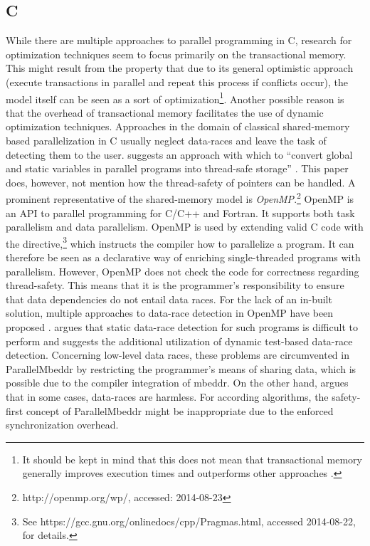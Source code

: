 \subsection{C}
While there are multiple approaches to parallel programming in C, research for optimization techniques seem to focus primarily on the transactional memory\cite{DynamicPerformanceTuning}\cite{LoweringTheOverhead}. This might result from the property that due to its general optimistic approach (execute transactions in parallel and repeat this process if conflicts occur), the model itself can be seen as a sort of optimization\footnote{It should be kept in mind that this does not mean that transactional memory generally improves execution times and outperforms other approaches \cite{ResearchToy}.}. Another possible reason is that the overhead of transactional memory \cite{LoweringTheOverhead} facilitates the use of dynamic optimization techniques. Approaches in the domain of classical shared-memory based parallelization in C usually neglect data-races \cite{HowToMiscompilePrograms} and leave the task of detecting them to the user. \cite{LocalizingGlobalsAndStatics} suggests an approach with which to ``convert global and static variables in parallel programs into thread-safe storage'' \cite{LocalizingGlobalsAndStatics}. This paper does, however, not mention how the thread-safety of pointers can be handled. A prominent representative of the shared-memory model is \textit{OpenMP}.\footnote{http://openmp.org/wp/, accessed: 2014-08-23} OpenMP is an API to parallel programming for C/C++ and Fortran\cite[p.~1]{OpenMP}. It supports both task parallelism and data parallelism. OpenMP is used by extending valid C code with the  directive,\footnote{See https://gcc.gnu.org/onlinedocs/cpp/Pragmas.html, accessed 2014-08-22, for details.} which instructs the compiler how to parallelize a program. It can therefore be seen as a declarative way of enriching single-threaded programs with parallelism. However, OpenMP does not check the code for correctness regarding thread-safety. This means that it is the programmer's responsibility to ensure that data dependencies do not entail data races. For the lack of an in-built solution, multiple approaches to data-race detection in OpenMP have been proposed \cite{NonConcurrencyAnalysis}. \cite{OpenMPSupport} argues that static data-race detection for such programs is difficult to perform and suggests the additional utilization of dynamic test-based data-race detection. Concerning low-level data races, these problems are circumvented in ParallelMbeddr by restricting the programmer's means of sharing data, which is possible due to the compiler integration of mbeddr. On the other hand, \cite{HowToMiscompilePrograms} argues that in some cases, data-races are harmless. For according algorithms, the safety-first concept of ParallelMbeddr might be inappropriate due to the enforced synchronization overhead.

